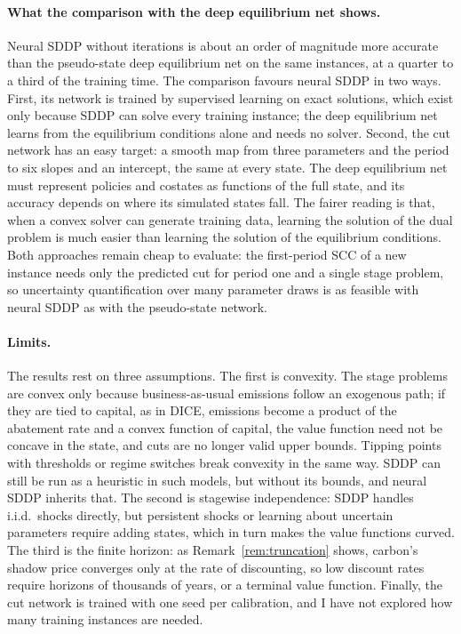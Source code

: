 \paragraph{What the comparison with the deep equilibrium net shows.} Neural SDDP without iterations is about an order of magnitude more accurate than the pseudo-state deep equilibrium net on the same instances, at a quarter to a third of the training time. The comparison favours neural SDDP in two ways. First, its network is trained by supervised learning on exact solutions, which exist only because SDDP can solve every training instance; the deep equilibrium net learns from the equilibrium conditions alone and needs no solver. Second, the cut network has an easy target: a smooth map from three parameters and the period to six slopes and an intercept, the same at every state. The deep equilibrium net must represent policies and costates as functions of the full state, and its accuracy depends on where its simulated states fall. The fairer reading is that, when a convex solver can generate training data, learning the solution of the dual problem is much easier than learning the solution of the equilibrium conditions. Both approaches remain cheap to evaluate: the first-period SCC of a new instance needs only the predicted cut for period one and a single stage problem, so uncertainty quantification over many parameter draws is as feasible with neural SDDP as with the pseudo-state network.

\paragraph{Limits.} The results rest on three assumptions. The first is convexity. The stage problems are convex only because business-as-usual emissions follow an exogenous path; if they are tied to capital, as in DICE, emissions become a product of the abatement rate and a convex function of capital, the value function need not be concave in the state, and cuts are no longer valid upper bounds. Tipping points with thresholds or regime switches \parencite{LemoineTraeger2014,CaiLontzek2019} break convexity in the same way. SDDP can still be run as a heuristic in such models, but without its bounds, and neural SDDP inherits that. The second is stagewise independence: SDDP handles i.i.d.\ shocks directly, but persistent shocks or learning about uncertain parameters require adding states, which in turn makes the value functions curved. The third is the finite horizon: as Remark~\ref{rem:truncation} shows, carbon's shadow price converges only at the rate of discounting, so low discount rates require horizons of thousands of years, or a terminal value function. Finally, the cut network is trained with one seed per calibration, and I have not explored how many training instances are needed.


